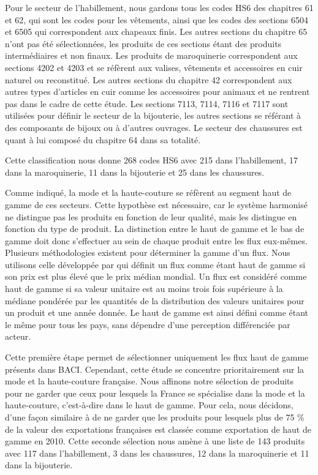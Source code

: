 \documentclass[french,10pt,a4paper]{article}
\begin{document}
Pour le secteur de l'habillement, nous gardons tous les codes HS6 des chapitres 61 et 62, qui sont les codes pour les vêtements, ainsi que les codes des sections 6504 et 6505 qui correspondent aux chapeaux finis. Les autres sections du chapitre 65 n'ont pas été sélectionnées, les produits de ces sections étant des produits intermédiaires et non finaux. Les produits de maroquinerie correspondent aux sections 4202 et 4203 et se réfèrent aux valises, vêtements et accessoires en cuir naturel ou reconstitué. Les autres sections du chapitre 42 correspondent aux autres types d'articles en cuir comme les accessoires pour animaux et ne rentrent pas dans le cadre de cette étude. Les sections 7113, 7114, 7116 et 7117 sont utilisées pour définir le secteur de la bijouterie, les autres sections se référant à des composants de bijoux ou à d'autres ouvrages. Le secteur des chaussures est quant à lui composé du chapitre 64 dans sa totalité.

Cette classification nous donne 268 codes HS6 avec 215 dans l'habillement, 17 dans la maroquinerie, 11 dans la bijouterie et 25 dans les chaussures. 

Comme indiqué, la mode et la haute-couture se réfèrent au segment haut de gamme de ces secteurs. Cette hypothèse est nécessaire, car le système harmonisé ne distingue pas les produits en fonction de leur qualité, mais les distingue en fonction du type de produit. La distinction entre le haut de gamme et le bas de gamme doit donc s'effectuer au sein de chaque produit entre les flux eux-mêmes. Plusieurs méthodologies existent pour déterminer la gamme d'un flux. Nous utilisons celle développée par \cite{Fontagne1997} qui définit un flux comme étant haut de gamme si son \og prix\fg{} est plus élevé que le \og prix\fg{} médian mondial. Un flux est considéré comme haut de gamme si sa valeur unitaire est au moins trois fois supérieure à la médiane pondérée par les quantités de la distribution des valeurs unitaires pour un produit et une année donnée. Le haut de gamme est ainsi défini comme étant le même pour tous les pays, sans dépendre d'une perception différenciée par acteur.

Cette première étape permet de sélectionner uniquement les flux haut de gamme présents dans BACI. Cependant, cette étude se concentre prioritairement sur la mode et la haute-couture française. Nous affinons notre sélection de produits pour ne garder que ceux pour lesquels la France se spécialise dans la mode et la haute-couture, c'est-à-dire dans le haut de gamme. Pour cela, nous décidons, d'une façon similaire à \cite{Martin2015} de ne garder que les produits pour lesquels plus de 75 \% de la valeur des exportations françaises est classée comme exportation de haut de gamme en 2010. Cette seconde sélection nous amène à une liste de 143 produits avec 117 dans l'habillement, 3 dans les chaussures, 12 dans la maroquinerie et 11 dans la bijouterie.
\end{document}
